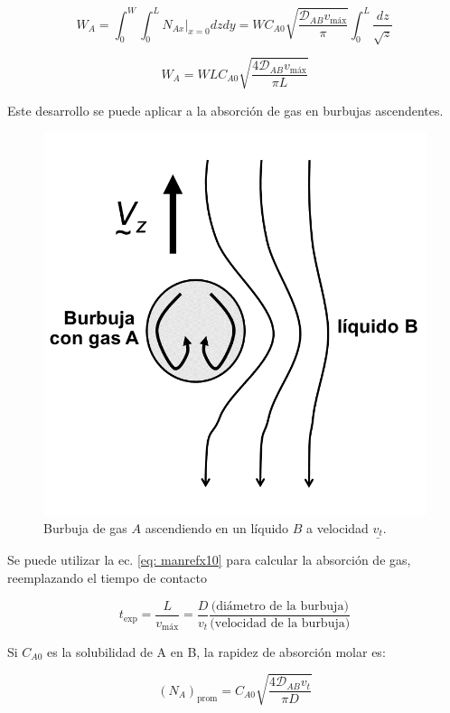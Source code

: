  $$W_A = \int_0^W \int_0^L N_{Ax}|_{x=0} dz dy = WC_{A0} \sqrt{\frac{\mathcal{D}_{AB} v_{\text{máx}}}{\pi}} \int_0^L \frac{dz}{\sqrt{z}}$$
 
 \begin{equation} \label{eq: manrefx10}
 W_A = WLC_{A0} \sqrt{\frac{4\mathcal{D}_{AB} v_{\text{máx}}}{\pi L}}
 \end{equation}
 
 Este desarrollo se puede aplicar a la absorción de gas en burbujas ascendentes.
 
 \begin{figure}[H]
 	\centering
 	\includegraphics[scale=0.2]{./Capitulo2/Imagenes/fig-2-6.PNG}
 	\caption{Burbuja de gas $A$ ascendiendo en un líquido $B$ a velocidad $\underline{v_t}$.}
 \end{figure}
 
 Se puede utilizar la ec. \eqref{eq: manrefx10} para calcular la absorción de gas, reemplazando el tiempo de contacto 
 
 $$t_{\text{exp}} = \frac{L}{v_{\text{máx}}} = \frac{D}{v_t} \frac{\text{(diámetro de la burbuja)}}{\text{(velocidad de la burbuja)}}$$
 
 Si $C_{A0}$ es la solubilidad de A en B, la rapidez de absorción molar es:
 
 \begin{equation}
 	(N_A)_{\text{prom}} = C_{A0} \sqrt{\frac{4 \mathcal{D}_{AB} v_t}{\pi D}}
 \end{equation}
 
